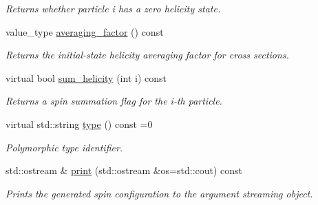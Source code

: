 \begin{DoxyCompactItemize}
\begin{DoxyCompactList}\small\item\em Returns whether particle i has a zero helicity state. \end{DoxyCompactList}\item 
\hypertarget{a00271_a47689b9dfa69a269bd103e9b2e5fd0ad}{}value\+\_\+type \hyperlink{a00271_a47689b9dfa69a269bd103e9b2e5fd0ad}{averaging\+\_\+factor} () const \label{a00271_a47689b9dfa69a269bd103e9b2e5fd0ad}

\begin{DoxyCompactList}\small\item\em Returns the initial-\/state helicity averaging factor for cross sections. \end{DoxyCompactList}\item 
virtual bool \hyperlink{a00271_ab8d236622fd171df60d0b733d1ae1720}{sum\+\_\+helicity} (int i) const 
\begin{DoxyCompactList}\small\item\em Returns a spin summation flag for the i-\/th particle. \end{DoxyCompactList}\item 
\hypertarget{a00271_a32fbc77c747b6af90230ea0f26123ccc}{}virtual std\+::string \hyperlink{a00271_a32fbc77c747b6af90230ea0f26123ccc}{type} () const =0\label{a00271_a32fbc77c747b6af90230ea0f26123ccc}

\begin{DoxyCompactList}\small\item\em Polymorphic type identifier. \end{DoxyCompactList}\item 
std\+::ostream \& \hyperlink{a00271_a55f9f3fdf26128fe54e9eec4ac4de750}{print} (std\+::ostream \&os=std\+::cout) const 
\begin{DoxyCompactList}\small\item\em Prints the generated spin configuration to the argument streaming object. \end{DoxyCompactList}\end{DoxyCompactItemize}
